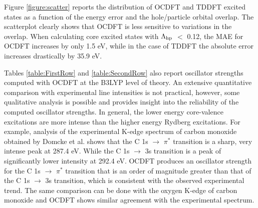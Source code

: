 \documentclass[12pt]{article}
\begin{document}
Figure \ref{figure:scatter} reports the distribution of OCDFT and TDDFT excited states as a function of the energy error and the hole/particle orbital overlap. The scatterplot clearly shows that OCDFT is less sensitive to variations in the overlap. When calculating core excited states with $\Lambda_{\rm hp}$ $<$ 0.12, the MAE for OCDFT increases by only 1.5 eV, while in the case of TDDFT the absolute error increases drastically by 35.9 eV.
\begin{mdframed}[hidealllines=true,backgroundcolor=blue!20]
Tables \ref{table:FirstRow} and \ref{table:SecondRow} also report oscillator strengths computed with OCDFT at the B3LYP level of theory. An extensive quantitative comparison with experimental line intensities is not practical, however, some qualitative analysis is possible and provides insight into the reliability of the computed oscillator strengths. In general, the lower energy core-valence excitations are more intense than the higher energy Rydberg excitations. For example, analysis of the experimental K-edge spectrum of carbon monoxide obtained by Domcke et al. shows that the C 1s $\rightarrow$ $\pi^*$ transition is a sharp, very intense peak at 287.4 eV. While the C 1s $\rightarrow$ 3s transition is a peak of significantly lower intensity at 292.4 eV. OCDFT produces an oscillator strength for the C 1s $\rightarrow$ $\pi^*$ transition that is an order of magnitude greater than that of the C 1s $\rightarrow$ 3s transition, which is consistent with the observed experimental trend. The same comparison can be done with the oxygen K-edge of carbon monoxide and OCDFT shows similar agreement with the experimental spectrum.
\end{mdframed}
\end{document}
